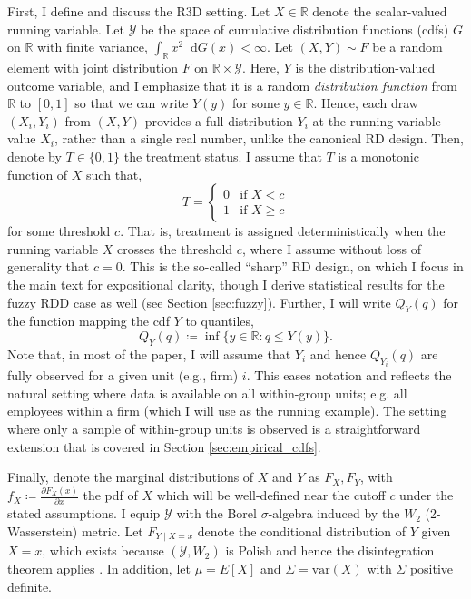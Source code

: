 \documentclass[12pt]{article}
\newcommand*\dd{\mathop{}\!\mathrm{d}}
\begin{document}
First, I define and discuss the R3D setting. Let $X \in \mathbb{R}$ denote the scalar-valued running variable. Let $\mathcal{Y}$ be the space of cumulative distribution functions (cdfs) $G$ on $\mathbb{R}$ with finite variance, $\int_{\mathbb{R}} x^2 \dd G(x) < \infty$. Let $(X,Y) \sim F$ be a random element with joint distribution $F$ on $\mathbb{R} \times \mathcal{Y}$. Here, $Y$ is the distribution-valued outcome variable, and I emphasize that it is a random \textit{distribution function} from $\mathbb{R}$ to $[0,1]$ so that we can write $Y(y)$ for some $y \in \mathbb{R}$. Hence, each draw $(X_i, Y_i)$ from $(X,Y)$ provides a full distribution $Y_i$ at the running variable value $X_i$, rather than a single real number, unlike the canonical RD design. Then, denote by $T \in \{0,1\}$ the treatment status. I assume that $T$ is a monotonic function of $X$ such that,
\[T=\begin{cases} 0 & \text{if } X < c \\ 1 & \text{if } X \geq c \end{cases}\] 
for some threshold $c$. That is, treatment is assigned deterministically when the running variable $X$ crosses the threshold $c$, where I assume without loss of generality that $c=0$. This is the so-called ``sharp'' RD design, on which I focus in the main text for expositional clarity, though I derive statistical results for the fuzzy RDD case as well (see Section \ref{sec:fuzzy}). Further, I will write $Q_{Y}(q)$ for the function mapping the cdf $Y$ to quantiles,
\[
Q_Y(q) \coloneqq \inf \{y \in \mathbb{R}: q \leq Y(y)\}.
\]
Note that, in most of the paper, I will assume that $Y_i$ and hence $Q_{Y_i}(q)$ are fully observed for a given unit (e.g., firm) $i$. This eases notation and reflects the natural setting where data is available on all within-group units; e.g. all employees within a firm (which I will use as the running example). The setting where only a sample of within-group units is observed is a straightforward extension that is covered in Section \ref{sec:empirical_cdfs}.

Finally, denote the marginal distributions of $X$ and $Y$ as $F_X, F_Y$, with $f_X \coloneqq \frac{\partial F_X(x)}{\partial x}$ the pdf of $X$ which will be well-defined near the cutoff $c$ under the stated assumptions. I equip $\mathcal{Y}$ with the Borel $\sigma$-algebra induced by the $W_2$ (2-Wasserstein) metric. Let $F_{Y\mid X=x}$ denote the conditional distribution of $Y$ given $X=x$, which exists because $(\mathcal{Y},W_2)$ is Polish \citep{villani2008optimal} and hence the disintegration theorem applies \citep{chang1997conditioning}. In addition, let $\mu = E[X]$ and $ \Sigma = \text{var}(X)$ with $\Sigma$ positive definite. 
\end{document}
